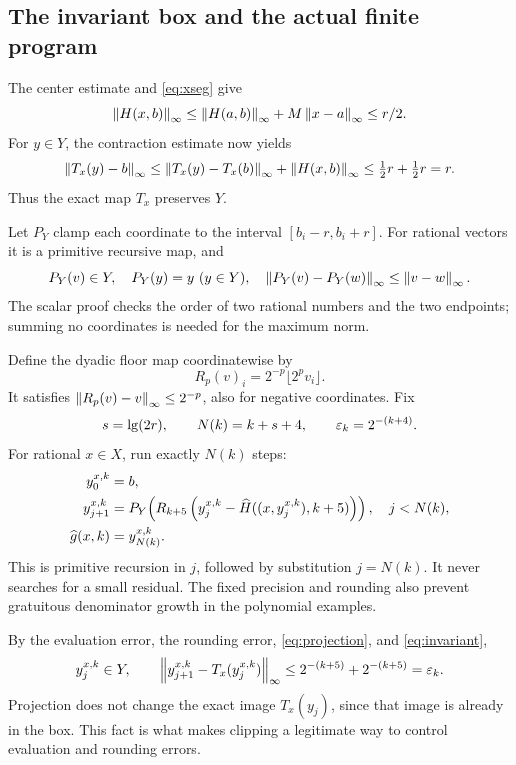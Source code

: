 \subsection{The invariant box and the actual finite program}

The center estimate and \eqref{eq:xseg} give
\[
 \left\lVert H(x,b)\right\rVert_\infty
 \le\left\lVert H(a,b)\right\rVert_\infty+M\left\lVert x-a\right\rVert_\infty\le r/2.
\]
For \(y\in Y\), the contraction estimate now yields
\begin{equation}\label{eq:invariant}
 \left\lVert T_x(y)-b\right\rVert_\infty
 \le\left\lVert T_x(y)-T_x(b)\right\rVert_\infty+\left\lVert H(x,b)\right\rVert_\infty
 \le\tfrac12r+\tfrac12r=r.
\end{equation}
Thus the exact map \(T_x\) preserves \(Y\).

Let \(P_Y\) clamp each coordinate to the interval
\([b_i-r,b_i+r]\). For rational vectors it is a primitive recursive
map, and
\begin{equation}\label{eq:projection}
 P_Y(v)\in Y,\quad P_Y(y)=y\ (y\in Y),\quad
 \left\lVert P_Y(v)-P_Y(w)\right\rVert_\infty\le\left\lVert v-w\right\rVert_\infty.
\end{equation}
The scalar proof checks the order of two rational numbers and the
two endpoints; summing no coordinates is needed for the maximum
norm.

Define the dyadic floor map coordinatewise by
\[
 R_p(v)_i=2^{-p}\lfloor 2^p v_i\rfloor.
\]
It satisfies \(\left\lVert R_p(v)-v\right\rVert_\infty\le2^{-p}\), also for negative
coordinates. Fix
\begin{equation}\label{eq:schedule}
 s=\operatorname{lg}(2r),\qquad
 N(k)=k+s+4,\qquad
 \varepsilon_k=2^{-(k+4)}.
\end{equation}
For rational \(x\in X\), run exactly \(N(k)\) steps:
\begin{align}
 y_0^{x,k}&=b,\nonumber\\
 y_{j+1}^{x,k}
 &=P_Y\!\left(R_{k+5}
       \left(y_j^{x,k}-\widehat H((x,y_j^{x,k}),k+5)\right)\right),
       \quad j<N(k),\label{eq:algorithm}\\
 \widehat g(x,k)&=y_{N(k)}^{x,k}.\nonumber
\end{align}
This is primitive recursion in \(j\), followed by substitution
\(j=N(k)\). It never searches for a small residual.
The fixed precision and rounding also prevent gratuitous denominator
growth in the polynomial examples.

By the evaluation error, the rounding error, \eqref{eq:projection},
and \eqref{eq:invariant},
\begin{equation}\label{eq:step-error}
 y_j^{x,k}\in Y,\qquad
 \left\lVert y_{j+1}^{x,k}-T_x(y_j^{x,k})\right\rVert_\infty
 \le2^{-(k+5)}+2^{-(k+5)}=\varepsilon_k.
\end{equation}
Projection does not change the exact image \(T_x(y_j)\), since
that image is already in the box. This fact is what makes
clipping a legitimate way to control evaluation and rounding
errors.

